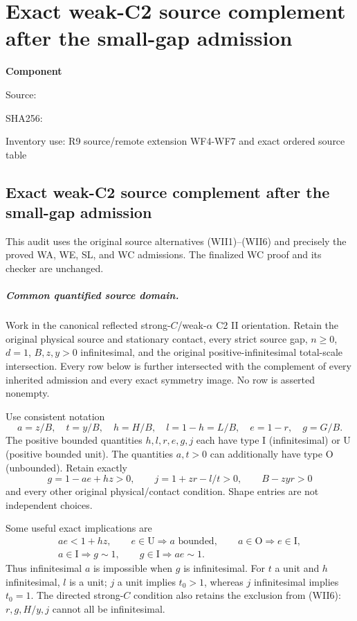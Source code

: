 \chapter{Exact weak-C2 source complement after the small-gap admission}
\label{component:pe2fc3cbe3819}
\noindent\textbf{Component }\par
{\small\noindent Source: \par}
{\small\noindent SHA256: \par}
{\small\noindent Inventory use: R9 source/remote extension WF4-WF7 and exact ordered source table\par}
\medskip
\section{Exact weak-C2 source complement after the small-gap admission}
\label{pe2fc3cbe3819:sec:r13-weak-frontier}

This audit uses the original source alternatives (WII1)--(WII6)
and precisely the proved WA, WE, SL, and WC admissions.
The finalized WC proof and its checker are unchanged.

\paragraph{Common quantified source domain.}
Work in the canonical reflected strong-$C$/weak-$\alpha$ C2 II
orientation. Retain the original physical source and stationary
contact, every strict source gap, $n\ge0$, $d=1$,
$B,z,y>0$ infinitesimal, and the original positive-infinitesimal
total-scale intersection. Every row below is further intersected
with the complement of every inherited admission and every exact
symmetry image. No row is asserted nonempty.

Use consistent notation
\[
 a=z/B,\quad t=y/B,\quad h=H/B,\quad l=1-h=L/B,\quad
 e=1-r,\quad g=G/B.
\]
The positive bounded quantities $h,l,r,e,g,j$ each have type
$\mathrm I$ (infinitesimal) or $\mathrm U$ (positive bounded unit).
The quantities $a,t>0$ can additionally have type
$\mathrm O$ (unbounded). Retain exactly
\[
 g=1-ae+hz>0,\qquad j=1+zr-l/t>0,\qquad B-zyr>0
\]
and every other original physical/contact condition. Shape entries
are not independent choices.

Some useful exact implications are
\[
 \begin{gathered}
 ae<1+hz,\qquad e\in\mathrm U\Longrightarrow a\text{ bounded},
 \qquad a\in\mathrm O\Longrightarrow e\in\mathrm I,\\
 a\in\mathrm I\Longrightarrow g\sim1,\qquad
 g\in\mathrm I\Longrightarrow ae\sim1.
 \end{gathered}                                                \tag{WF1}
\]
Thus infinitesimal $a$ is impossible when $g$ is infinitesimal.
For $t$ a unit and $h$ infinitesimal, $l$ is a unit; $j$ a unit
implies $t_0>1$, whereas $j$ infinitesimal implies $t_0=1$.
The directed strong-$C$ condition also retains the exclusion from
(WII6): $r,g,H/y,j$ cannot all be infinitesimal.

